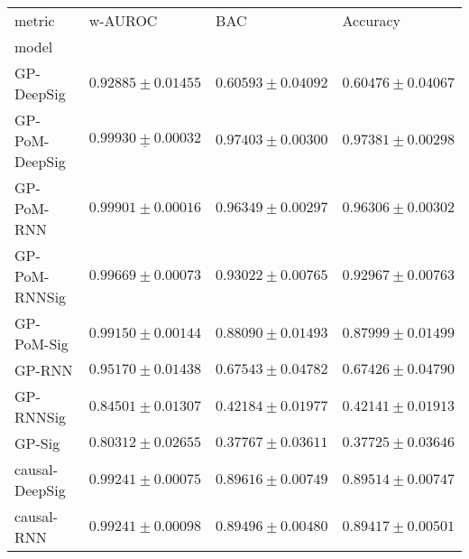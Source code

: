 \begin{tabular}{llll}
\toprule
metric &                                           w-AUROC &                                               BAC &                                          Accuracy \\
model          &                                                   &                                                   &                                                   \\
\midrule
GP-DeepSig     &                           $ 0.92885 \pm 0.01455 $ &                           $ 0.60593 \pm 0.04092 $ &                           $ 0.60476 \pm 0.04067 $ \\
GP-PoM-DeepSig &            $  \underline{ 0.99930 \pm 0.00032 } $ &               $  \mathbf{ 0.97403 \pm 0.00300 } $ &               $  \mathbf{ 0.97381 \pm 0.00298 } $ \\
GP-PoM-RNN     &                           $ 0.99901 \pm 0.00016 $ &                           $ 0.96349 \pm 0.00297 $ &                           $ 0.96306 \pm 0.00302 $ \\
GP-PoM-RNNSig  &                           $ 0.99669 \pm 0.00073 $ &                           $ 0.93022 \pm 0.00765 $ &                           $ 0.92967 \pm 0.00763 $ \\
GP-PoM-Sig     &                           $ 0.99150 \pm 0.00144 $ &                           $ 0.88090 \pm 0.01493 $ &                           $ 0.87999 \pm 0.01499 $ \\
GP-RNN         &                           $ 0.95170 \pm 0.01438 $ &                           $ 0.67543 \pm 0.04782 $ &                           $ 0.67426 \pm 0.04790 $ \\
GP-RNNSig      &                           $ 0.84501 \pm 0.01307 $ &                           $ 0.42184 \pm 0.01977 $ &                           $ 0.42141 \pm 0.01913 $ \\
GP-Sig         &                           $ 0.80312 \pm 0.02655 $ &                           $ 0.37767 \pm 0.03611 $ &                           $ 0.37725 \pm 0.03646 $ \\
causal-DeepSig &                           $ 0.99241 \pm 0.00075 $ &                           $ 0.89616 \pm 0.00749 $ &                           $ 0.89514 \pm 0.00747 $ \\
causal-RNN     &                           $ 0.99241 \pm 0.00098 $ &                           $ 0.89496 \pm 0.00480 $ &                           $ 0.89417 \pm 0.00501 $ \\

\end{tabular}
